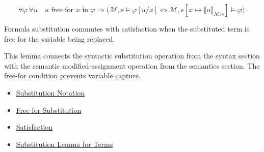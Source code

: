 \begin{remark*}
\[
\forall \varphi\,\forall u\quad
u \text{ free for } x \text{ in } \varphi
\Rightarrow
\bigl(
\mathcal M,s\models\varphi[u/x]
\Longleftrightarrow
\mathcal M,s[x\mapsto\llbracket u\rrbracket_{\mathcal M,s}]\models\varphi
\bigr).
\]
\end{remark*}

\begin{remark*}
Formula substitution commutes with satisfaction when the substituted term is
free for the variable being replaced.
\end{remark*}

\begin{remark*}[Interpretation]
This lemma connects the syntactic substitution operation from the syntax
section with the semantic modified-assignment operation from the semantics
section. The free-for condition prevents variable capture.
\end{remark*}

\begin{dependencies}
\begin{itemize}
  \item \hyperref[def:subst-notation]{Substitution Notation}
  \item \hyperref[def:free-for]{Free for Substitution}
  \item \hyperref[def:fol-satisfaction]{Satisfaction}
  \item \hyperref[lem:subst-terms]{Substitution Lemma for Terms}
\end{itemize}
\end{dependencies}
